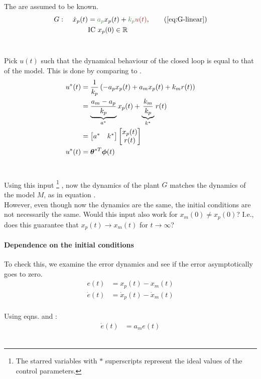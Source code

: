 The  are assumed to be known.
\begin{alignat*}{3}
    G&:~    & \dot{x}_p(t) &= \knownVar{a_p} x_p(t)
                    + \knownVar{k_p} \unknownVar{u(t)},
            \tag{\ref{eq:G-linear}}\\
            &&& \txt{IC } x_p(0) \in \R
\end{alignat*}~

Pick $u(t)$ such that the dynamical behaviour
of the closed loop is equal to that of the model.
This is done by comparing  to .
\begin{align*}
u^*(t)
    &= \frac{1}{k_p} \left( -a_p x_p(t) + a_m x_p(t) + k_m r(t) \right)\\
    &= \underbrace{\frac{a_m - a_p}{k_p}}_{a^*} x_p(t)
        + \underbrace{\frac{k_m}{k_p}}_{k^*} r(t)\\
    &= \begin{bmatrix}a^* & k^*\end{bmatrix} \begin{bmatrix}x_p(t) \\ r(t)\end{bmatrix}\\
u^*(t)
    &= \bm{\theta}^{*T} \bm{\phi}(t)
\end{align*}~

Using this input%
    \footnote{%
        The starred variables with $*$ superscripts represent
        the ideal values of the control parameters.
    }%
, now the dynamics of the plant $G$ matches the dynamics
of the model $M$, as in equation .\\

However, even though now the dynamics are the same,
the initial conditions are not necessarily the same.
Would this input also work for $x_m(0) \neq x_p(0)$?
I.e., does this guarantee that
$x_p(t) \rightarrow x_m(t)$ for $t \rightarrow \infty$?

\paragraph{Dependence on the initial conditions}
To check this, we examine the error dynamics
and see if the error asymptotically goes to zero.
\begin{align*}
e(t) &= x_p(t) - x_m(t)\\
\dot{e}(t) &= \dot{x}_p(t) - \dot{x}_m(t)\\
\end{align*}

Using eqns.  and :
\begin{align}
\dot{e}(t)    &= a_m e(t)
\label{eq:error-dynamics}
\end{align}~

